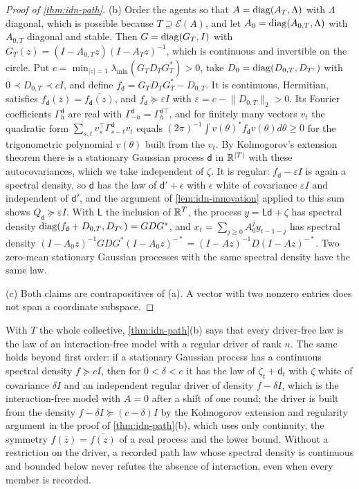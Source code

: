 \begin{proof}[Proof of \cref{thm:idn-path}]
(b) Order the agents so that $A=\operatorname{diag}(A_T,\Lambda)$ with $\Lambda$ diagonal, which is possible because $T\supseteq\mathcal E(A)$, and let $A_0=\operatorname{diag}(A_{0,T},\Lambda)$ with $A_{0,T}$ diagonal and stable. Then $G=\operatorname{diag}(G_T,I)$ with $G_T(z)=(I-A_{0,T}z)(I-A_Tz)^{-1}$, which is continuous and invertible on the circle. Put $c=\min_{|z|=1}\lambda_{\min}(G_TD_TG_T^*)>0$, take $D_0=\operatorname{diag}(D_{0,T},D_{T^c})$ with $0\prec D_{0,T}\prec cI$, and define $f_{\mathsf d}=G_TD_TG_T^*-D_{0,T}$. It is continuous, Hermitian, satisfies $f_{\mathsf d}(\bar z)=\overline{f_{\mathsf d}(z)}$, and $f_{\mathsf d}\succeq\varepsilon I$ with $\varepsilon=c-\lVert D_{0,T}\rVert_2>0$. Its Fourier coefficients $\Gamma^{\mathsf d}_h$ are real with $\Gamma^{\mathsf d}_{-h}=\Gamma^{\mathsf d\top}_h$, and for finitely many vectors $v_t$ the quadratic form $\sum_{s,t}v_s^{\top}\Gamma^{\mathsf d}_{s-t}v_t$ equals $(2\pi)^{-1}\int v(\theta)^*f_{\mathsf d}v(\theta)d\theta\ge0$ for the trigonometric polynomial $v(\theta)$ built from the $v_t$. By Kolmogorov's extension theorem there is a stationary Gaussian process $\mathsf d$ in $\mathbb{R}^{|T|}$ with these autocovariances, which we take independent of $\zeta$. It is regular: $f_{\mathsf d}-\varepsilon I$ is again a spectral density, so $\mathsf d$ has the law of $\mathsf d'+\epsilon$ with $\epsilon$ white of covariance $\varepsilon I$ and independent of $\mathsf d'$, and the argument of \cref{lem:idn-innovation} applied to this sum shows $Q_{\mathsf d}\succeq\varepsilon I$. With $\mathsf L$ the inclusion of $\mathbb{R}^T$, the process $y=\mathsf L\mathsf d+\zeta$ has spectral density $\operatorname{diag}(f_{\mathsf d}+D_{0,T},D_{T^c})=GDG^*$, and $x_t=\sum_{j\ge0}A_0^jy_{t-1-j}$ has spectral density $(I-A_0z)^{-1}GDG^*(I-A_0z)^{-*}=(I-Az)^{-1}D(I-Az)^{-*}$. Two zero-mean stationary Gaussian processes with the same spectral density have the same law.

(c) Both claims are contrapositives of (a). A vector with two nonzero entries does not span a coordinate subspace.
\end{proof}

\begin{remark}\label{rem:idn-fullrank}
With $T$ the whole collective, \cref{thm:idn-path}(b) says that every driver-free law is the law of an interaction-free model with a regular driver of rank $n$. The same holds beyond first order: if a stationary Gaussian process has a continuous spectral density $f\succeq cI$, then for $0<\delta<c$ it has the law of $\zeta_t+\mathsf d_t$ with $\zeta$ white of covariance $\delta I$ and an independent regular driver of density $f-\delta I$, which is the interaction-free model with $A=0$ after a shift of one round; the driver is built from the density $f-\delta I\succeq(c-\delta)I$ by the Kolmogorov extension and regularity argument in the proof of \cref{thm:idn-path}(b), which uses only continuity, the symmetry $f(\bar z)=\overline{f(z)}$ of a real process and the lower bound. Without a restriction on the driver, a recorded path law whose spectral density is continuous and bounded below never refutes the absence of interaction, even when every member is recorded.
\end{remark}

